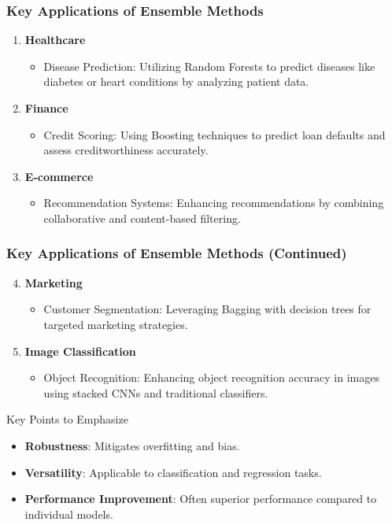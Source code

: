 \documentclass[aspectratio=169]{beamer}
\begin{document}
\begin{frame}[fragile]
    \frametitle{Key Applications of Ensemble Methods}
    \begin{enumerate}
        \item \textbf{Healthcare}
            \begin{itemize}
                \item Disease Prediction: Utilizing Random Forests to predict diseases like diabetes or heart conditions by analyzing patient data.
            \end{itemize}
        \item \textbf{Finance}
            \begin{itemize}
                \item Credit Scoring: Using Boosting techniques to predict loan defaults and assess creditworthiness accurately.
            \end{itemize}
        \item \textbf{E-commerce}
            \begin{itemize}
                \item Recommendation Systems: Enhancing recommendations by combining collaborative and content-based filtering.
            \end{itemize}
    \end{enumerate}
\end{frame}

\begin{frame}[fragile]
    \frametitle{Key Applications of Ensemble Methods (Continued)}
    \begin{enumerate}
        \setcounter{enumi}{3}
        \item \textbf{Marketing}
            \begin{itemize}
                \item Customer Segmentation: Leveraging Bagging with decision trees for targeted marketing strategies.
            \end{itemize}
        \item \textbf{Image Classification}
            \begin{itemize}
                \item Object Recognition: Enhancing object recognition accuracy in images using stacked CNNs and traditional classifiers.
            \end{itemize}
    \end{enumerate}
    \begin{block}{Key Points to Emphasize}
        \begin{itemize}
            \item \textbf{Robustness}: Mitigates overfitting and bias.
            \item \textbf{Versatility}: Applicable to classification and regression tasks.
            \item \textbf{Performance Improvement}: Often superior performance compared to individual models.
        \end{itemize}
    \end{block}
\end{frame}
\end{document}

